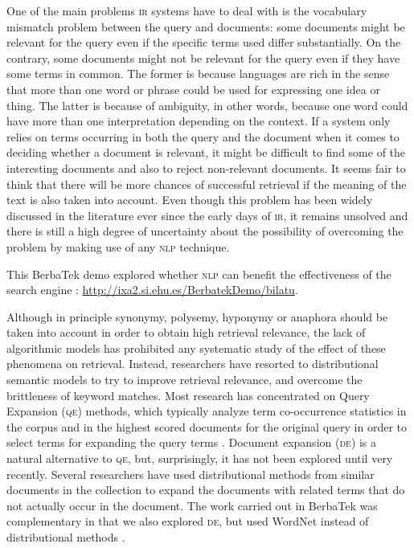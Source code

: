 \documentclass[output=paper]{LSP/langsci}
\begin{document}
One of the main problems \textsc{ir} systems have to deal with is the vocabulary mismatch problem between the query and documents: some documents might be relevant for the query even if the specific terms used differ substantially. On the contrary, some documents might not be relevant for the query even if they have some terms in common. The former is because languages are rich in the sense that more than one word or phrase could be used for expressing one idea or thing. The latter is because of ambiguity, in other words, because one word could have more than one interpretation depending on the context. If a system only relies on terms occurring in both the query and the document when it comes to deciding whether a document is relevant, it might be difficult to find some of the interesting documents and also to reject non-relevant documents. It seems fair to think that there will be more chances of successful retrieval if the meaning of the text is also taken into account. Even though this problem has been widely discussed in the literature ever since the early days of \textsc{ir}, it remains unsolved and there is still a high degree of uncertainty about the possibility of overcoming the problem by making use of any \textsc{nlp} technique.

This BerbaTek demo explored whether \textsc{nlp} can benefit the effectiveness of the search engine \citep{Otegi2012}: \url{http://ixa2.si.ehu.es/BerbatekDemo/bilatu}.

Although in principle synonymy, polysemy, hyponymy or anaphora should be taken into account in order to obtain high retrieval relevance, the lack of algorithmic models has prohibited any systematic study of the effect of these phenomena on retrieval. Instead, researchers have resorted to distributional semantic models to try to improve retrieval relevance, and overcome the brittleness of keyword matches. Most research has concentrated on Query Expansion (\textsc{qe}) methods, which typically analyze term co-occurrence statistics in the corpus and in the highest scored documents for the original query in order to select terms for expanding the query terms \citep{ManningEtAl2009}. Document expansion (\textsc{de}) is a natural alternative to \textsc{qe}, but, surprisingly, it has not been explored until very recently. Several researchers have used distributional methods from similar documents in the collection to expand the documents with related terms that do not actually occur in the document. The work carried out in BerbaTek was complementary in that we also explored \textsc{de}, but used WordNet instead of distributional methods \citep{AgirreArregi2010}.
\end{document}
